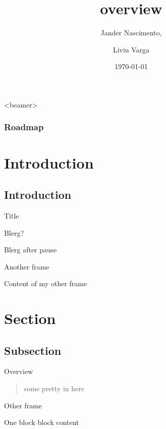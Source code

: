 \documentclass{beamer}
\title[Transactional storage for geo-replicated systems ]{overview}
\author{Jander Nascimento,
\and Liviu Varga}
\institute{Université Joseph Fourier}
\date{\today}
\begin{document}
\begin{frame}
\titlepage
\end{frame}

{
  \begin{frame}<beamer>
    \frametitle{Roadmap}
    \tableofcontents%
  \end{frame}
}


\section{Introduction}

	\subsection*{Introduction}
		\begin{frame}{Title}

			Blerg?			
			
			\pause			
			Blerg after pause
		
			
		\end{frame}

		\begin{frame}{Another frame}

			Content of my other frame	
			
		\end{frame}
		


\section{Section}

	\subsection{Subsection}
		\begin{frame}{Overview}
		
			\begin{quotation}
			some pretty in here
			\end{quotation} 
		

		\end{frame}
		
		\begin{frame}{Other frame}

			\begin{block}{One block}
				block content
			\end{block}
		
		\end{frame}
 	
\end{document}
